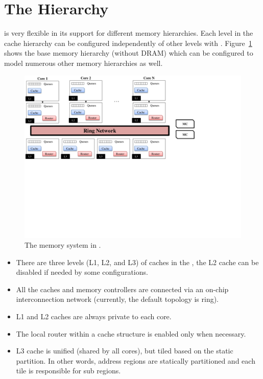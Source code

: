 \section{The Hierarchy}
\label{sec:memhierarchy}

\SIM is very flexible in its support for different memory hierarchies. Each
level in the cache hierarchy can be configured independently of other levels
with .
Figure~\ref{fig:memory} shows the base memory hierarchy (without DRAM) which
can be configured to model numerous other memory hierarchies as well.

\begin{figure}[htb]
\centering
\includegraphics[width=6.5in]{figs/memory}
\caption{The memory system in \SIM.}
\label{fig:memory}
\end{figure}


\begin{itemize} \item There are three levels (L1, L2, and L3) of caches in the
\SIM , the L2 cache can be disabled if needed by some configurations.

  \item All the caches  and memory controllers are
  connected via an on-chip interconnection network (currently, the default
      topology is ring).

  \item L1 and L2 caches are always private to each core.

  \item The local router within a cache structure is enabled only when
  necessary.

  \item L3 cache is unified (shared by all cores), but tiled based on
  the static  partition. In other words, address regions are
  statically partitioned and each tile is responsible for sub regions.

\end{itemize}


